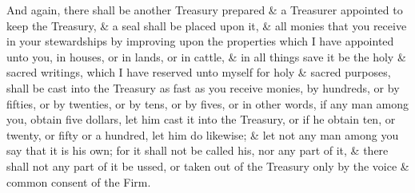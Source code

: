 					And again, there shall be another Treasury prepared \& a Treasurer appointed to keep the Treasury, \& a seal shall be placed upon it, \& all monies that you receive in your stewardships by improving upon the properties which I have appointed unto you, in houses, or in lands, or in cattle, \& in all things save it be the holy \& sacred writings, which I have reserved unto myself for holy \& sacred purposes, shall be cast into the Treasury as fast as you receive monies, by hundreds, or by fifties, or by twenties, or by tens, or by fives, or in other words, if any man among you, obtain five dollars, let him cast it into the Treasury, or if he obtain ten, or twenty, or fifty or a hundred, let him do likewise; \& let not any man among you say that it is his own; for it shall not be called his, nor any part of it, \& there shall not any part of it be ussed, or taken out of the Treasury only by the voice \& common consent of the Firm.

